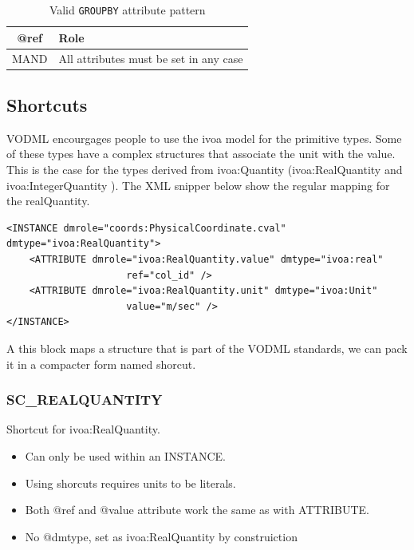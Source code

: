 \documentclass[11pt,a4paper]{ivoa}
\begin{document}
\begin{table}[!htbp]
\small
\centering
\begin{tabulary}{\linewidth}{|C|J|}
       \hline
           \textbf{@ref} &  
           \textbf{Role} \\
        \hline  
           MAND    &            
           All attributes must be set in any case \\       
       \hline 
\end{tabulary}
\caption{Valid \texttt{GROUPBY} attribute pattern} 
\label{tbl:group-patterns}
\end{table}


%
%
\subsection{Shortcuts}
VODML encourgages people to use the ivoa model for the primitive types. 
Some of these types have a complex structures that associate the unit with the value. 
This is the case for the types derived from ivoa:Quantity (ivoa:RealQuantity and ivoa:IntegerQuantity ).
The XML snipper below show the regular mapping for the realQuantity.

\begin{lstlisting}[caption={ivoa:RealQuantity example},style=XML]
<INSTANCE dmrole="coords:PhysicalCoordinate.cval"
dmtype="ivoa:RealQuantity">
    <ATTRIBUTE dmrole="ivoa:RealQuantity.value" dmtype="ivoa:real"
                     ref="col_id" />
    <ATTRIBUTE dmrole="ivoa:RealQuantity.unit" dmtype="ivoa:Unit"
                     value="m/sec" />
</INSTANCE>
\end{lstlisting}



A this block maps a structure that is part of the VODML standards, we can pack it in a compacter form named shorcut.

\subsubsection{SC\_REALQUANTITY}
Shortcut for ivoa:RealQuantity.

\begin{itemize}
    \item Can only be used within an INSTANCE.        
    \item Using shorcuts requires units to be literals.    
    \item Both @ref and @value attribute work the same as with ATTRIBUTE.
    \item No @dmtype,  set as ivoa:RealQuantity by construiction
 \end{itemize}
\end{document}
